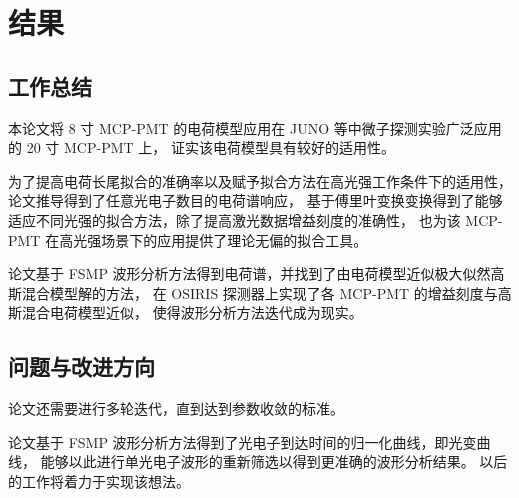
\chapter{结果}

\section{工作总结}
本论文将 8 寸 MCP-PMT 的电荷模型应用在 JUNO 等中微子探测实验广泛应用的 20 寸 MCP-PMT 上，
证实该电荷模型具有较好的适用性。

为了提高电荷长尾拟合的准确率以及赋予拟合方法在高光强工作条件下的适用性，论文推导得到了任意光电子数目的电荷谱响应，
基于傅里叶变换变换得到了能够适应不同光强的拟合方法，除了提高激光数据增益刻度的准确性，
也为该 MCP-PMT 在高光强场景下的应用提供了理论无偏的拟合工具。

论文基于 FSMP 波形分析方法得到电荷谱，并找到了由电荷模型近似极大似然高斯混合模型解的方法，
在 OSIRIS 探测器上实现了各 MCP-PMT 的增益刻度与高斯混合电荷模型近似，
使得波形分析方法迭代成为现实。

\section{问题与改进方向}
论文还需要进行多轮迭代，直到达到参数收敛的标准。

论文基于 FSMP 波形分析方法得到了光电子到达时间的归一化曲线，即光变曲线，
能够以此进行单光电子波形的重新筛选以得到更准确的波形分析结果。
以后的工作将着力于实现该想法。
